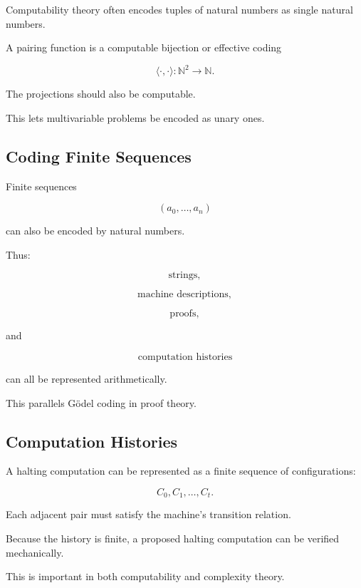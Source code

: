 Computability theory often encodes tuples of natural numbers as single
natural numbers.

A pairing function is a computable bijection or effective coding

\[
\boxed{
\langle\cdot,\cdot\rangle:
\mathbb{N}^2
\rightarrow
\mathbb{N}.
}
\]

The projections should also be computable.

This lets multivariable problems be encoded as unary ones.

\subsection{Coding Finite Sequences}
\label{subsec:coding-finite-sequences}

Finite sequences

\[
(a_0,\ldots,a_n)
\]

can also be encoded by natural numbers.

Thus:

\[
\boxed{
\text{strings},
}
\]

\[
\boxed{
\text{machine descriptions},
}
\]

\[
\boxed{
\text{proofs},
}
\]

and

\[
\boxed{
\text{computation histories}
}
\]

can all be represented arithmetically.

This parallels Gödel coding in proof theory.

\subsection{Computation Histories}
\label{subsec:computation-histories}

A halting computation can be represented as a finite sequence of
configurations:

\[
\boxed{
C_0,C_1,\ldots,C_t.
}
\]

Each adjacent pair must satisfy the machine's transition relation.

Because the history is finite, a proposed halting computation can be
verified mechanically.

This is important in both computability and complexity theory.

